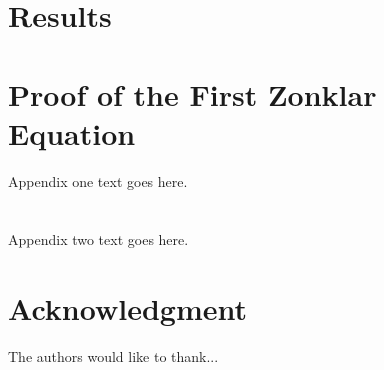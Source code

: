 \documentclass[journal]{IEEEtran}
\begin{document}
\section{Results}
\begin{table}[H]
    \centering
    \caption{Using Different Frond Ends to Extract Bounding Boxes and Segmentation}
    \label{tab:my-table}
\end{table}
\appendices
\section{Proof of the First Zonklar Equation}
Appendix one text goes here.

\section{}
Appendix two text goes here.


\section*{Acknowledgment}


The authors would like to thank...


\ifCLASSOPTIONcaptionsoff
  \newpage
\fi



\end{document}
